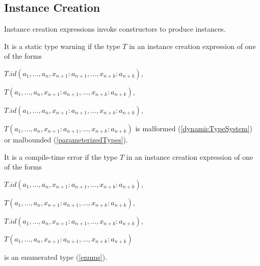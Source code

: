 \documentclass{article}
\begin{document}
\subsection{ Instance Creation}

\LMHash{}
Instance creation expressions invoke constructors to produce instances.



\LMHash{}
It is a static type warning if
the type $T$ in an instance creation expression of one of  the forms

\NEW{} $T.id(a_1, \ldots , a_n, x_{n+1}: a_{n+1}, \ldots , x_{n+k}: a_{n+k})$,

\NEW{} $T(a_1, \ldots , a_n, x_{n+1}: a_{n+1}, \ldots , x_{n+k}: a_{n+k})$,

\CONST{} $T.id(a_1, \ldots , a_n, x_{n+1}: a_{n+1}, \ldots , x_{n+k}: a_{n+k})$,

\CONST{} $T(a_1, \ldots , a_n, x_{n+1}: a_{n+1}, \ldots , x_{n+k}: a_{n+k})$ is malformed (\ref{dynamicTypeSystem}) or malbounded (\ref{parameterizedTypes}).

\LMHash{}
It is a compile-time error if the type $T$ in an instance creation expression of one of the forms

\NEW{} $T.id(a_1, \ldots , a_n, x_{n+1}: a_{n+1}, \ldots , x_{n+k}: a_{n+k})$,

\NEW{} $T(a_1, \ldots , a_n, x_{n+1}: a_{n+1}, \ldots , x_{n+k}: a_{n+k})$,

\CONST{} $T.id(a_1, \ldots , a_n, x_{n+1}: a_{n+1}, \ldots , x_{n+k}: a_{n+k})$,

\CONST{} $T(a_1, \ldots , a_n, x_{n+1}: a_{n+1}, \ldots , x_{n+k}: a_{n+k})$

is an enumerated type (\ref{enums}).
\end{document}
